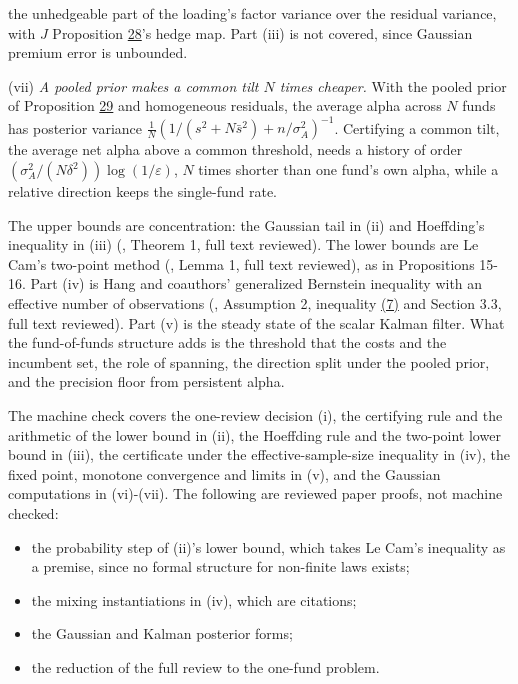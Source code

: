 \documentclass[11pt]{article}
\begin{document}
the unhedgeable part of the loading's factor variance over the
residual variance, with \(J\) Proposition \hyperref[res:Proposition-28]{28}'s hedge map. Part (iii) is
not covered, since Gaussian premium error is unbounded.

(vii) \emph{A pooled prior makes a common tilt \(N\) times cheaper.} With the
pooled prior of Proposition \hyperref[res:Proposition-29]{29} and homogeneous residuals, the average
alpha across \(N\) funds has posterior variance
\(\frac1N(1/(s^2+N\bar s^2)+n/\sigma_A^2)^{-1}\). Certifying a common tilt, the
average net alpha above a common threshold, needs a history of order
\((\sigma_A^2/(N\delta^2))\log(1/\varepsilon)\), \(N\) times shorter than one fund's own
alpha, while a relative direction keeps the single-fund rate.

The upper bounds are concentration: the Gaussian tail in (ii) and
Hoeffding's inequality in (iii) (\cite{hoeffding1963probability}, Theorem 1,
full text reviewed). The lower bounds are Le Cam's two-point method
(\cite{lecam1973convergence}, Lemma 1, full text reviewed), as in Propositions
15-16. Part (iv) is Hang and coauthors' generalized Bernstein
inequality with an effective number of observations
(\cite{hang2016learning}, Assumption 2, inequality \hyperref[eq:7]{(7)} and Section 3.3, full
text reviewed). Part (v) is the steady state of the scalar Kalman
filter. What the fund-of-funds structure adds is the threshold that
the costs and the incumbent set, the role of spanning, the direction
split under the pooled prior, and the precision floor from persistent
alpha.

The machine check covers the one-review decision (i), the certifying
rule and the arithmetic of the lower bound in (ii), the Hoeffding rule
and the two-point lower bound in (iii), the certificate under the effective-sample-size inequality
in (iv), the fixed point, monotone convergence and limits in (v), and
the Gaussian computations in (vi)-(vii). The following are reviewed
paper proofs, not machine checked:

\begin{itemize}
  \item the probability step of (ii)'s lower bound, which takes Le Cam's
  inequality as a premise, since no formal structure for non-finite
  laws exists;
  \item the mixing instantiations in (iv), which are citations;
  \item the Gaussian and Kalman posterior forms;
  \item the reduction of the full review to the one-fund problem.
\end{itemize}
\end{document}
